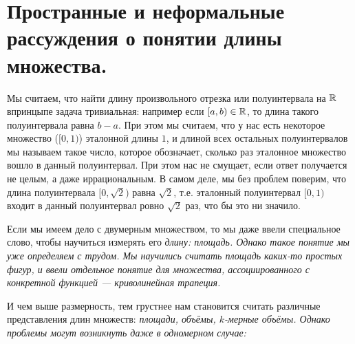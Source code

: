 \section{Пространные и неформальные рассуждения о понятии длины множества.}

Мы считаем, что найти длину произвольного отрезка или полуинтервала на $\mathbb{R}$ впринцыпе задача тривиальная:
например если $[a, b) \in \mathbb{R}$, то длина такого полуинтервала равна $b - a$. При этом мы считаем, что у нас есть
некоторое множество ($[0, 1)$) эталонной длины $1$, и длиной всех остальных полуинтервалов мы называем
такое число, которое обозначает, сколько раз эталонное множество вошло в данный полуинтервал. При этом нас не
смущает, если ответ получается не целым, а даже иррациональным. В самом деле, мы без проблем поверим, что длина
полуинтервала $[0, \sqrt{2})$ равна $\sqrt{2}$, т.е. эталонный полуинтервал $[0, 1)$ входит в данный полуинтервал
ровно $\sqrt{2}$ раз, что бы это ни значило.

Если мы имеем дело с двумерным множеством, то мы даже ввели специальное слово, чтобы научиться измерять его \it{длину}:
\it{площадь}. Однако такое понятие мы уже определяем с трудом. Мы научились считать площадь каких-то простых фигур,
и ввели отдельное понятие для множества, ассоциированного с конкретной функцией --- \it{криволинейная трапеция}.

И чем выше размерность, тем грустнее нам становится считать различные представления длин множеств:
\it{площади}, \it{объёмы}, \it{$k$-мерные объёмы}. Однако проблемы могут возникнуть даже в одномерном случае:

